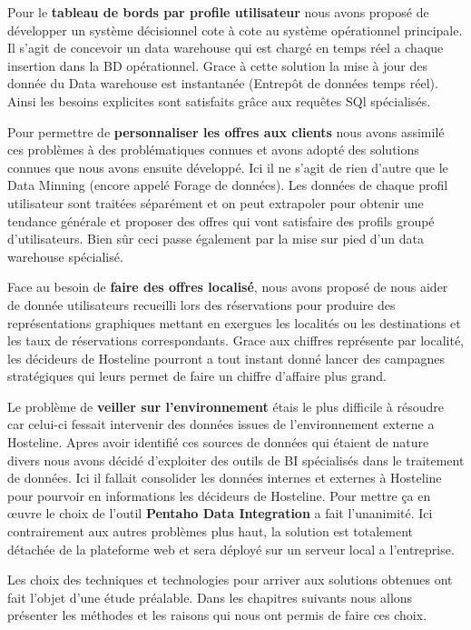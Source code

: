 \begin{list}{•}{ }
\item Pour le \textbf{tableau de bords par profile utilisateur} nous avons proposé de développer un système décisionnel cote à cote au système opérationnel principale. Il s’agit de concevoir un data warehouse qui est chargé en temps réel a chaque insertion dans la BD opérationnel. Grace à cette solution la mise à jour des donnée du Data warehouse est instantanée (Entrepôt de données temps réel).  Ainsi les besoins explicites sont satisfaits grâce aux requêtes SQl spécialisés.\\

\item Pour permettre de \textbf{personnaliser les offres aux clients} nous avons assimilé ces problèmes à des problématiques connues et avons adopté des solutions connues que nous avons ensuite développé. Ici il ne s’agit de rien d’autre que le Data Minning (encore appelé Forage de données). Les données de chaque profil utilisateur sont traitées séparément et on peut extrapoler pour obtenir une tendance générale et proposer des offres qui vont satisfaire des profils groupé d’utilisateurs. Bien sûr ceci passe également par la mise sur pied d’un data warehouse spécialisé.

\item Face au besoin de \textbf{faire des offres localisé}, nous avons proposé de nous aider de donnée utilisateurs recueilli lors des réservations pour produire des représentations graphiques mettant en exergues les localités ou  les destinations et les taux de réservations correspondants. Grace aux chiffres représente par localité, les décideurs de Hosteline pourront a tout instant donné lancer des campagnes stratégiques qui leurs permet de faire un chiffre d’affaire plus grand.\\

\item Le problème de \textbf{veiller sur l'environnement} étais le plus difficile à résoudre car celui-ci fessait intervenir des données issues de l'environnement externe a Hosteline. Apres avoir identifié ces sources de données qui étaient de nature divers nous avons décidé d’exploiter des outils de BI spécialisés dans le traitement de données. Ici il fallait consolider les données internes et externes à Hosteline pour pourvoir en informations les décideurs de Hosteline. Pour mettre ça en œuvre le choix de l'outil \textbf{Pentaho Data Integration} a fait l'unanimité. Ici contrairement aux autres problèmes plus haut, la solution est totalement détachée de la plateforme web et sera déployé sur un serveur local a l’entreprise.

\end{list}


Les choix des techniques et technologies pour arriver aux solutions obtenues ont fait l’objet d’une étude préalable. Dans les chapitres suivants nous allons présenter les méthodes et les raisons qui nous ont permis de faire ces choix.

